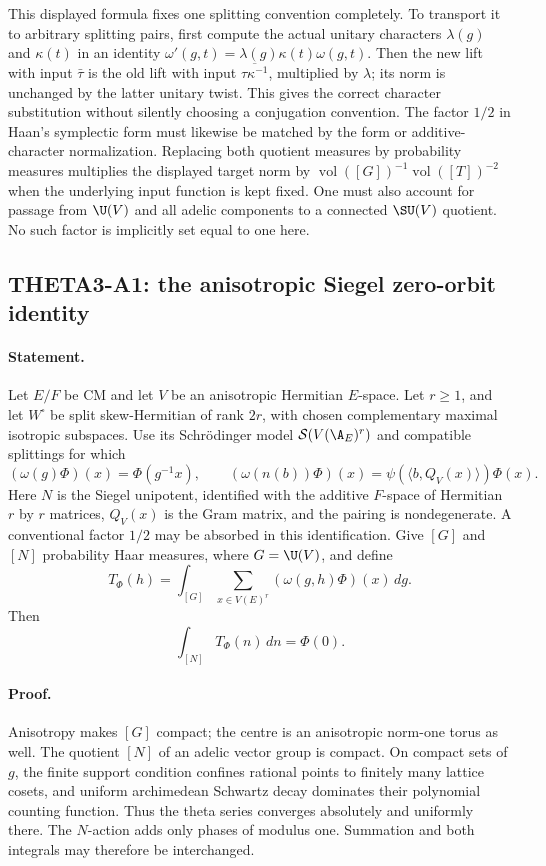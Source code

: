 This displayed formula fixes one splitting convention completely.
To transport it to arbitrary splitting pairs, first compute the actual
unitary characters $\lambda(g)$ and $\kappa(t)$ in an identity
$\omega'(g,t)=\lambda(g)\kappa(t)\omega(g,t)$. Then the new lift with
input $\bar\tau$ is the old lift with input
$\overline{\tau\kappa^{-1}}$, multiplied by $\lambda$; its norm is
unchanged by the latter unitary twist. This gives the correct character
substitution without silently choosing a conjugation convention.
The factor $1/2$ in Haan's symplectic form must likewise be matched by
the form or additive-character normalization. Replacing both quotient
measures by probability measures multiplies the displayed target norm
by $\operatorname{vol}([G])^{-1}\operatorname{vol}([T])^{-2}$ when the
underlying input function is kept fixed. One must also account for
passage from $\U(V)$ and all adelic components to a connected
$\SU(V)$ quotient. No such factor is implicitly set equal to one here.

\subsection{THETA3-A1: the anisotropic Siegel zero-orbit identity}\label{A1}

\paragraph{Statement.}
Let $E/F$ be CM and let $V$ be an anisotropic Hermitian $E$-space.
Let $r\geq1$, and let $W^{\square}$ be split skew-Hermitian of rank
$2r$, with chosen complementary maximal isotropic subspaces. Use its
Schr\"odinger model $\mathcal S(V(\A_E)^r)$ and compatible splittings
for which
\[
 (\omega(g)\Phi)(x)=\Phi(g^{-1}x),\qquad
 (\omega(n(b))\Phi)(x)=\psi(\langle b,Q_V(x)\rangle)\Phi(x).
\]
Here $N$ is the Siegel unipotent, identified with the additive
$F$-space of Hermitian $r$ by $r$ matrices, $Q_V(x)$ is the Gram
matrix, and the pairing is nondegenerate. A conventional factor
$1/2$ may be absorbed in this identification. Give $[G]$ and $[N]$
probability Haar measures, where $G=\U(V)$, and define
\[
 T_\Phi(h)=\int_{[G]}\sum_{x\in V(E)^r}(\omega(g,h)\Phi)(x)\,dg.
\]
Then
\begin{equation}\label{A1-eq}
                    \int_{[N]}T_\Phi(n)\,dn=\Phi(0).
\end{equation}

\paragraph{Proof.}
Anisotropy makes $[G]$ compact; the centre is an anisotropic norm-one
torus as well. The quotient $[N]$ of an adelic vector group is compact.
On compact sets of $g$, the finite support condition confines rational
points to finitely many lattice cosets, and uniform archimedean
Schwartz decay dominates their polynomial counting function. Thus the
theta series converges absolutely and uniformly there. The $N$-action
adds only phases of modulus one. Summation and both integrals may
therefore be interchanged.

